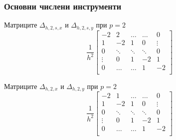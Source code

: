 \documentclass{beamer}
\begin{document}
\begin{frame}
\frametitle{Основни числени инструменти}

Матриците $\Delta_{h,2,s,x}$ и $\Delta_{h,2,s,y}$ при $p=2$
\[
\frac{1}{h^2}
\begin{bmatrix}
    -2	       & 2        &     \dots   &   \dots        & 0   \\
    1               & -2            &   1           &   0               & \vdots    \\
        0           & \ddots        &    \ddots    &   \ddots       &  0 \\ 
    \vdots       &     0            &  1     	& -2    	   & 1 \\
    0               & \dots          &  \dots         & 1  	   & -2 \\
\end{bmatrix}
\]

Матриците $\Delta_{h,2,x}$ и $\Delta_{h,2,y}$ при $p=2$
\[
\frac{1}{h^2}
\begin{bmatrix}
    -2	       & 1        &     \dots   &   \dots        & 0   \\
    1               & -2            &   1           &   0               & \vdots    \\
        0           & \ddots        &    \ddots    &   \ddots       &  0 \\ 
    \vdots       &     0            &  1     	& -2    	   & 1 \\
    0               & \dots          &  \dots         & 1  	   & -2 \\
\end{bmatrix}
\]
\end{frame}

%
\end{document}
